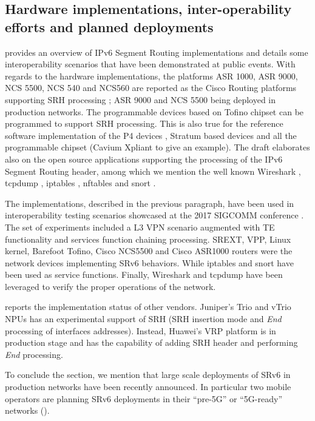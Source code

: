 \subsection{Hardware implementations, inter-operability efforts and planned deployments}
\label{sec:hw_interop}

\cite{srv6-inter-op} provides an overview of IPv6 Segment Routing implementations and details some interoperability scenarios that have been demonstrated at public events. With regards to the hardware implementations, the platforms ASR 1000, ASR 9000, NCS 5500, NCS 540 and NCS560 are reported as the Cisco Routing platforms supporting SRH processing \cite{cisco}; ASR 9000 and NCS 5500 being deployed in production networks. The programmable devices based on Tofino chipset \cite{barefoot} can be programmed to support SRH processing. This is also true for the reference software implementation of the P4 devices \cite{bmv2}, Stratum based devices \cite{stratum} and all the programmable chipset (Cavium Xpliant \cite{cavium} to give an example). The draft elaborates also on the open source applications supporting the processing of the IPv6 Segment Routing header, among which we mention the well known Wireshark \cite{wireshark}, tcpdump \cite{tcpdump}, iptables \cite{iptables}, nftables \cite{nftables} and snort \cite{snort}.

The implementations, described in the previous paragraph, have been used in interoperability testing scenarios showcased at the 2017 SIGCOMM conference \cite{interop-demo}. The set of experiments included a L3 VPN scenario augmented with TE functionality and services function chaining processing. SREXT, VPP, Linux kernel, Barefoot Tofino, Cisco NCS5500 and Cisco ASR1000 routers were the network devices implementing SRv6 behaviors. While iptables and snort have been used as service functions. Finally, Wireshark and tcpdump have been leveraged to verify the proper operations of the network. 

\cite{ietf-6man-segment-routing-header} reports the implementation status of other vendors. Juniper's Trio and vTrio NPUs has an experimental support of SRH (SRH insertion mode and \textit{End} processing of interfaces addresses). Instead, Huawei's VRP platform is in production stage and has the capability of adding SRH header and performing \textit{End} processing.

To conclude the section, we mention that large scale deployments of SRv6 in production networks have been recently announced. In particular two mobile operators are planning SRv6 deployments in their ``pre-5G'' or ``5G-ready'' networks (\cite{blog-cisco-softbank-srv6,blog-cisco-iliad-srv6}).


